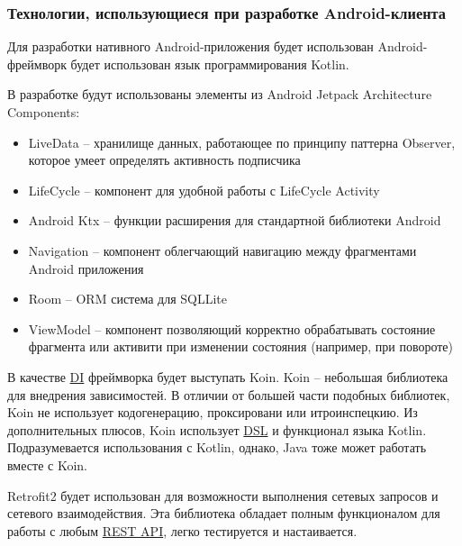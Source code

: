
\subsubsection{Технологии, использующиеся при разработке Android-клиента}\indent

Для разработки нативного Android-приложения будет использован Android-фреймворк будет использован язык программирования Kotlin.

В разработке будут использованы элементы из Android Jetpack Architecture Components:
\begin{itemize}
    \item LiveData – хранилище данных, работающее по принципу паттерна Observer, которое умеет определять активность подписчика
    \item LifeCycle – компонент для удобной работы с LifeCycle Activity
    \item Android Ktx – функции расширения для стандартной библиотеки Android
    \item Navigation – компонент облегчающий навигацию между фрагментами Android приложения
    \item Room – ORM система для SQLLite
    \item ViewModel – компонент позволяющий корректно обрабатывать состояние фрагмента или активити при изменении состояния (например, при повороте)
\end{itemize}

В качестве \hyperlink{gloss:di}{DI} фреймворка будет выступать Koin.
Koin – небольшая библиотека для внедрения зависимостей.
В отличии от большей части подобных библиотек, Koin не использует кодогенерацию, проксировани или итроинспецкию.
Из дополнительных плюсов, Koin использует \hyperlink{gloss:dsl}{DSL} и функционал языка Kotlin.
Подразумевается использования с Kotlin, однако, Java тоже может работать вместе с Koin.


Retrofit2 будет использован для возможности выполнения сетевых запросов и сетевого взаимодействия.
Эта библиотека обладает полным функционалом для работы с любым \hyperlink{gloss:rest}{REST API}, легко тестируется и настаивается.
